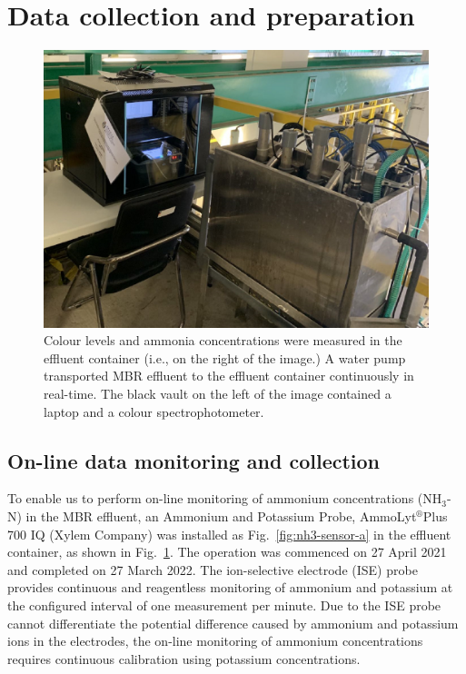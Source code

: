 \section{Data collection and preparation}

\begin{figure}[!ht]
    \centering
    \includegraphics[width=0.8\columnwidth]{imgs/instrument/sampling-tank.png}
    \caption{Colour levels and ammonia concentrations were measured in the effluent container (i.e., on the right of the image.) A water pump transported MBR effluent to the effluent container continuously in real-time. The black vault on the left of the image contained a laptop and a colour spectrophotometer.} 
    \label{fig:sampling-tank}
 \end{figure}

\subsection{On-line data monitoring and collection}
To enable us to perform on-line monitoring of ammonium concentrations (NH$_{3}$-N) in the MBR effluent, an Ammonium and Potassium Probe, AmmoLyt$^\circledR$Plus 700 IQ (Xylem Company) was installed as Fig.~\ref{fig:nh3-sensor-a} in the effluent container, as shown in Fig.~\ref{fig:sampling-tank}. The operation was commenced on 27 April 2021 and completed on 27 March 2022. The ion-selective electrode (ISE) probe provides continuous and reagentless monitoring of ammonium and potassium at the configured interval of one measurement per minute. Due to the ISE probe cannot differentiate the potential difference caused by ammonium and potassium ions in the electrodes, the on-line monitoring of ammonium concentrations requires continuous calibration using potassium concentrations.

